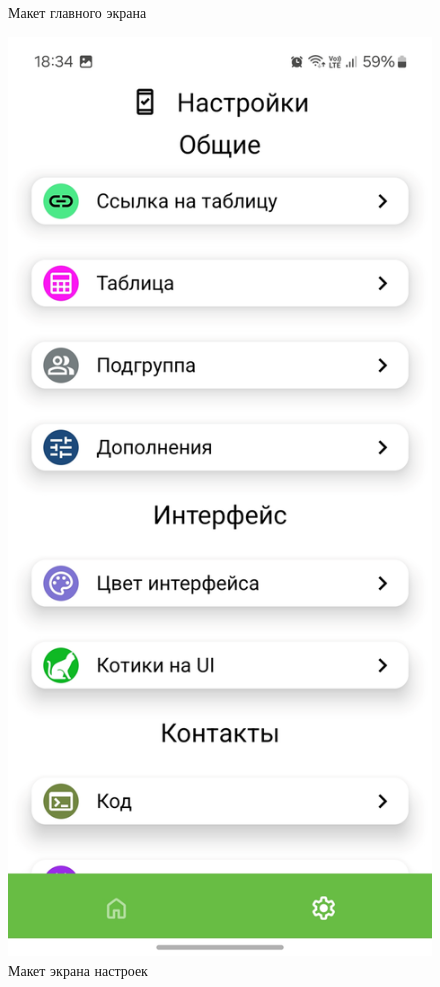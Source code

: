 \documentclass{vsureport}
\begin{document}
\begin{figure}[H]
\begin{minipage}{0.48\textwidth}
        \caption{Макет главного экрана}
        \label{fig:main_screen}
    \end{minipage}
    \hfill
    \begin{minipage}{0.48\textwidth}
        \centering
        \includegraphics[width=\linewidth]{14.png}
        \caption{Макет экрана настроек}
        \label{fig:settings_screen}
    \end{minipage}
\end{figure}
\end{document}

